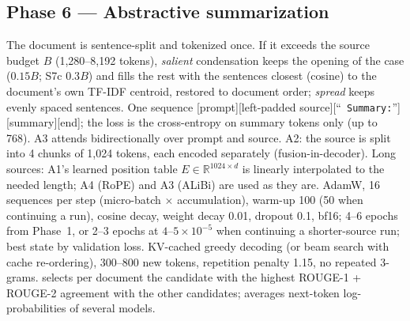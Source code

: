 \subsection{Phase 6 --- Abstractive summarization}
\begin{center}\end{center}
 The document is sentence-split and tokenized once.  If it exceeds the source budget $B$
(1,280--8,192 tokens), \emph{salient} condensation keeps the opening of the case ($0.15B$; S7c $0.3B$) and fills the
rest with the sentences closest (cosine) to the document's own TF-IDF centroid, restored to document order;
\emph{spread} keeps evenly spaced sentences.
 One sequence [prompt][left-padded source][``\texttt{ Summary:}''][summary][end]; the loss is the
cross-entropy on summary tokens only (up to 768).  A3 attends bidirectionally over prompt and source.  A2: the
source is split into 4 chunks of 1,024 tokens, each encoded separately (fusion-in-decoder).  Long sources: A1's
learned position table $E\in\mathbb{R}^{1024\times d}$ is linearly interpolated to the needed length; A4 (RoPE)
and A3 (ALiBi) are used as they are.
 AdamW, 16 sequences per step (micro-batch $\times$ accumulation), warm-up 100 (50 when
continuing a run), cosine decay, weight decay 0.01, dropout 0.1, bf16; 4--6 epochs from Phase~1, or 2--3 epochs
at $4$--$5\times10^{-5}$ when continuing a shorter-source run; best state by validation loss.
 KV-cached greedy decoding (or beam search with cache re-ordering), 300--800 new tokens,
repetition penalty 1.15, no repeated 3-grams.   selects per document the candidate with the highest
ROUGE-1 + ROUGE-2 agreement with the other candidates;  averages next-token log-probabilities
of several models.
\begin{center}\scriptsize{}\end{center}

